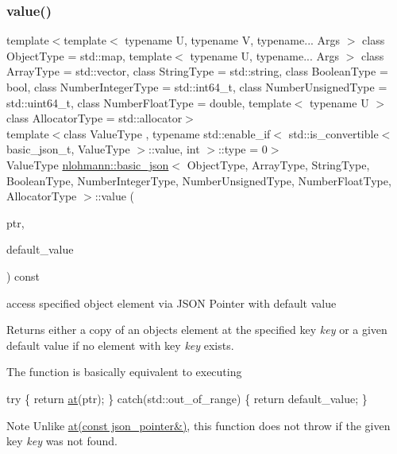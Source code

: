 \subsubsection{\texorpdfstring{value()}{value()}\hspace{0.1cm}{\footnotesize\ttfamily [3/4]}}
{\footnotesize\ttfamily template$<$template$<$ typename U, typename V, typename... Args $>$ class Object\+Type = std\+::map, template$<$ typename U, typename... Args $>$ class Array\+Type = std\+::vector, class String\+Type  = std\+::string, class Boolean\+Type  = bool, class Number\+Integer\+Type  = std\+::int64\+\_\+t, class Number\+Unsigned\+Type  = std\+::uint64\+\_\+t, class Number\+Float\+Type  = double, template$<$ typename U $>$ class Allocator\+Type = std\+::allocator$>$ \\
template$<$class Value\+Type , typename std\+::enable\+\_\+if$<$ std\+::is\+\_\+convertible$<$ basic\+\_\+json\+\_\+t, Value\+Type $>$\+::value, int $>$\+::type  = 0$>$ \\
Value\+Type \hyperlink{classnlohmann_1_1basic__json}{nlohmann\+::basic\+\_\+json}$<$ Object\+Type, Array\+Type, String\+Type, Boolean\+Type, Number\+Integer\+Type, Number\+Unsigned\+Type, Number\+Float\+Type, Allocator\+Type $>$\+::value (\begin{DoxyParamCaption}\item[{const \hyperlink{classnlohmann_1_1basic__json_1_1json__pointer}{json\+\_\+pointer} \&}]{ptr,  }\item[{Value\+Type}]{default\+\_\+value }\end{DoxyParamCaption}) const\hspace{0.3cm}{\ttfamily [inline]}}



access specified object element via J\+S\+ON Pointer with default value 

Returns either a copy of an object\textquotesingle{}s element at the specified key {\itshape key} or a given default value if no element with key {\itshape key} exists.

The function is basically equivalent to executing 
\begin{DoxyCode}
\textcolor{keywordflow}{try} \{
    \textcolor{keywordflow}{return} \hyperlink{classnlohmann_1_1basic__json_a214a8c22d616fd3567b88932c07436c9}{at}(ptr);
\} \textcolor{keywordflow}{catch}(std::out\_of\_range) \{
    \textcolor{keywordflow}{return} default\_value;
\}
\end{DoxyCode}


\begin{DoxyNote}{Note}
Unlike \hyperlink{classnlohmann_1_1basic__json_a649aef71e5d952499da7ad3b8e7c9236}{at(const json\+\_\+pointer\&)}, this function does not throw if the given key {\itshape key} was not found.
\end{DoxyNote}

